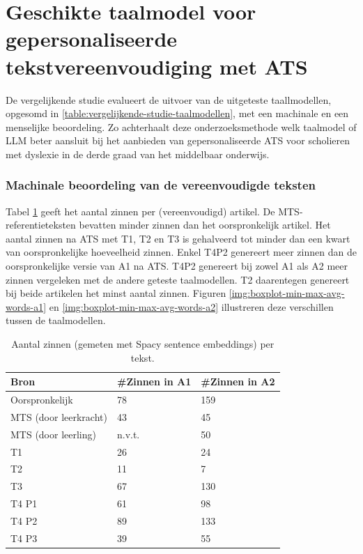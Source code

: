\section{Geschikte taalmodel voor gepersonaliseerde tekstvereenvoudiging met ATS}

De vergelijkende studie evalueert de uitvoer van de uitgeteste taallmodellen, opgesomd in \ref{table:vergelijkende-studie-taalmodellen}, met een machinale en een menselijke beoordeling. Zo achterhaalt deze onderzoeksmethode welk taalmodel of LLM beter aansluit bij het aanbieden van gepersonaliseerde ATS voor scholieren met dyslexie in de derde graad van het middelbaar onderwijs. 

\subsubsection{Machinale beoordeling van de vereenvoudigde teksten}

Tabel \ref{table:resultaten-aantal-zinnen} geeft het aantal zinnen per (vereenvoudigd) artikel. De MTS-referentieteksten bevatten minder zinnen dan het oorspronkelijk artikel. Het aantal zinnen na ATS met T1, T2 en T3 is gehalveerd tot minder dan een kwart van oorspronkelijke hoeveelheid zinnen. Enkel T4P2 genereert meer zinnen dan de oorspronkelijke versie van A1 na ATS. T4P2 genereert bij zowel A1 als A2 meer zinnen vergeleken met de andere geteste taalmodellen. T2 daarentegen genereert bij beide artikelen het minst aantal zinnen. Figuren \ref{img:boxplot-min-max-avg-words-a1} en \ref{img:boxplot-min-max-avg-words-a2} illustreren deze verschillen tussen de taalmodellen.

\begin{table}[h]
	\centering
	\begin{tabular}{ | m{3cm} | m{3cm} | m{3cm} | } 
		\hline
		\textbf{Bron} & \textbf{#Zinnen in A1} & \textbf{#Zinnen in A2} \\
		\hline
		Oorspronkelijk & 78  & 159 \\ 
		\hline
		MTS (door leerkracht) & 43 & 45 \\
		\hline
		MTS (door leerling) & n.v.t. & 50 \\
		\hline
		T1 & 26 & 24 \\
		\hline
		T2 & 11 & 7 \\
		\hline
		T3 & 67 & 130 \\
		\hline
		T4 P1 & 61 & 98 \\
		\hline
		T4 P2 & 89 & 133 \\
		\hline
		T4 P3 & 39 & 55 \\
		\hline
	\end{tabular}
	\caption{Aantal zinnen (gemeten met Spacy sentence embeddings) per tekst.}
	\label{table:resultaten-aantal-zinnen}
\end{table}

